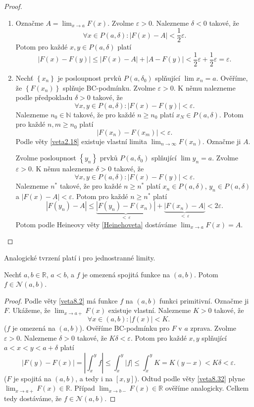 \begin{proof}\,
\begin{enumerate}
	\item[$\implies$] Označme $A=\lim_{x\to a } F(x)$. Zvolme $\varepsilon > 0$. Nalezneme $\delta < 0$ takové, že
	$$
	    \forall x \in P(a,\delta): |F(x)-A|<\frac{1}{2}\varepsilon.
	$$
	Potom pro každé $x,y \in P(a,\delta)$ platí
	$$
	 |F(x)-F(y)| \leq |F(x)-A| + |A-F(y)| < \frac{1}{2}\varepsilon+\frac{1}{2}\varepsilon=\varepsilon.
	$$
	\item[$\impliedby$] Nechť $\left \{ x_n \right \} $ je posloupnost prvků $P(a,\delta_0)$ splňující $\lim x_n = a$.
	Ověříme, že $\left \{ F(x_n) \right \} $ splňuje BC-podmínku. Zvolme $\varepsilon > 0$. K němu nalezneme
	podle předpokladu $\delta > 0$ takové, že
	$$
	    \forall x,y \in P(a,\delta): |F(x)-F(y)| < \varepsilon.
	$$
	Nalezneme $n_0 \in \mathbb N $ takové, že pro každé $n\geq n_0$ platí $x_N \in P(a,\delta)$.
	Potom pro každé $n,m \geq n_0$ platí
	$$
	    |F(x_n) - F(x_m)|<\varepsilon.
	$$
	Podle věty \ref{veta2.18} existuje vlastní limita
	$
 \lim_{n \to \infty} F(x_n)
	$. Označme ji $A$.
	\par Zvolme posloupnost $\left \{ y_n \right \} $ prvků $P(a,\delta_0)$ splňující
	$\lim y_n=a$. Zvolme $\varepsilon>0$. K němu nalezneme $\delta>0$ takové, že
	$$
	    \forall x,y \in P(a,\delta): |F(x)-F(y)|<\varepsilon.
	$$
	Nalezneme $n^*$ takové, že pro každé $n\geq n^*$ platí $x_n \in P(a,\delta)$, $y_n\in P(a,\delta)$ a $|F(x)-A|<\varepsilon$.
	Potom pro každé $n\geq n^*$ platí
	$$
	|F(y_n)-A|\leq \underbrace{|F(y_n)-F(x_n)|}_{< \, \varepsilon} + \underbrace{|F(x_n)-A|}_{< \, \varepsilon} < 2 \varepsilon.
	$$
	Potom podle Heineovy věty \ref{Heinehoveta} dostáváme $\lim_{x\to a } F(x)=A$.\qedhere
\end{enumerate}
\end{proof}

\begin{poznamka}
	Analogické tvrzení platí i pro jednostranné limity.
\end{poznamka}

\begin{veta}\label{veta8.33}
Nechť $a, b \in \mathbb{R}$, $a < b$, a $f$ je omezená spojitá funkce na $(a, b)$. Potom $f \in \mathcal N(a, b)$.
\end{veta}

\begin{proof}
Podle věty \ref{veta8.2} má funkce $f$ na $(a,b)$ funkci primitivní. Označme ji $F$.
Ukážeme, že $\lim_{x\to a+} F(x)$ existuje vlastní. Nalezneme $K>0$ takové, že
$$
    \forall x \in (a,b):|f(x)|<K.
$$
($f$ je omezená na $(a,b)$). Ověříme BC-podmínku pro $F$ v $a$ zprava. Zvolme
$\varepsilon>0$. Nalezneme $\delta>0$ takové, že $K\delta < \varepsilon$.
Potom pro každé $x,y$ splňující $a<x<y<a+\delta$ platí
$$
    |F(y)-F(x)| = \left | \int_x^y f \right | \leq \int_x^y |f| \leq \int_x^y K = K(y-x)<K\delta<\varepsilon.
$$
($F$ je spojitá na $(a,b)$, a tedy i na $[x,y]$). Odtud podle věty \ref{veta8.32} plyne $\lim_{x\to a+} F(x)\in \mathbb R $.
Případ $\lim_{x\to b-} F(x)\in \mathbb R $ ověříme analogicky. Celkem tedy dostáváme, že $f \in \mathcal N(a,b)$.
\end{proof}

